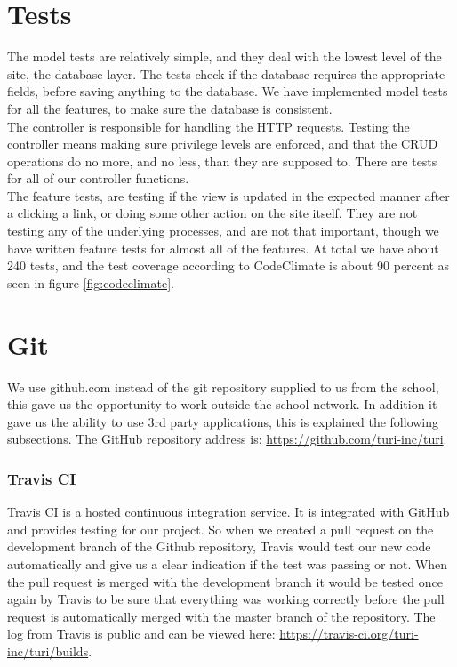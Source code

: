 \documentclass[a4paper]{article}
\begin{document}
\section{Tests}
\noindent
The model tests are relatively simple, and they deal with the lowest level of the site, the database layer. The tests check if the database requires the appropriate fields, before saving anything to the database. We have implemented model tests for all the features, to make sure the database is consistent.
\\

\noindent
The controller is responsible for handling the HTTP requests. Testing the controller means making sure privilege levels are enforced, and that the CRUD operations do no more, and no less, than they are supposed to. There are tests for all of our controller functions.
\\

\noindent
The feature tests, are testing if the view is updated in the expected manner after a clicking a link, or doing some other action on the site itself. They are not testing any of the underlying processes, and are not that important, though we have written feature tests for almost all of the features. 
At total we have about 240 tests, and the test coverage according to CodeClimate is about 90 percent as seen in figure \ref{fig:codeclimate}.
\\

\section{Git}
We use github.com instead of the git repository supplied to us from the school, this gave us the opportunity to work outside the school network. In addition it gave us the ability to use 3rd party applications, this is explained the following subsections. The GitHub repository address is: \url{https://github.com/turi-inc/turi}.

\subsubsection{Travis CI}
Travis CI is a hosted continuous integration service. It is integrated with GitHub and provides testing for our project. So when we created a pull request on the development branch of the Github repository, Travis would test our new code automatically and give us a clear indication if the test was passing or not. When the pull request is merged with the development branch it would be tested once again by Travis to be sure that everything was working correctly before the pull request is automatically merged with the master branch of the repository. The log from Travis is public and can be viewed here: \url{https://travis-ci.org/turi-inc/turi/builds}.
\end{document}
